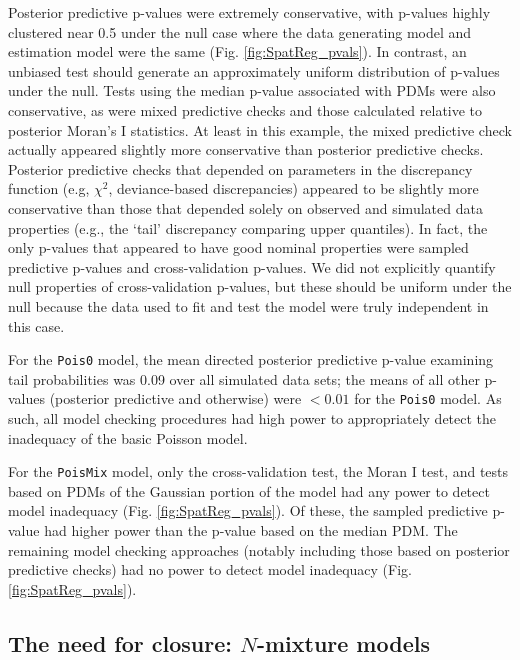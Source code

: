 \documentclass[12pt,english]{article}
\begin{document}
\begin{spacing}{1.9}
Posterior predictive p-values were extremely conservative, with
p-values highly clustered near 0.5 under the null case where the data
generating model and estimation model were the same
(Fig. \ref{fig:SpatReg_pvals}).  In contrast, an unbiased test should
generate an approximately uniform distribution of p-values under the
null.  Tests using the median p-value associated with PDMs were also
conservative, as were mixed predictive checks and those calculated
relative to posterior Moran's I statistics.  At least in this example,
the mixed predictive check actually appeared slightly more
conservative than posterior predictive checks.  Posterior predictive
checks that depended on parameters in the discrepancy function (e.g,
$\chi^2$, deviance-based discrepancies) appeared to be slightly more
conservative than those that depended solely on observed and simulated
data properties (e.g., the `tail' discrepancy comparing upper
quantiles).  In fact, the only p-values that appeared to have good
nominal properties were sampled predictive p-values and
cross-validation p-values.  We did not explicitly quantify null
properties of cross-validation p-values, but these should be uniform
under the null because the data used to fit and test the model were
truly independent in this case.

For the \texttt{Pois0} model, the mean directed posterior predictive
p-value examining tail probabilities was 0.09 over all simulated data
sets; the means of all other p-values (posterior predictive and
otherwise) were $<0.01$ for the \texttt{Pois0} model.  As such, all
model checking procedures had high power to appropriately detect the
inadequacy of the basic Poisson model.

For the \texttt{PoisMix} model, only the cross-validation test, the
Moran I test, and tests based on PDMs of the Gaussian portion of the
model had any power to detect model inadequacy
(Fig. \ref{fig:SpatReg_pvals}).  Of these, the sampled predictive
p-value had higher power than the p-value based on the median PDM.
The remaining model checking approaches (notably including those based
on posterior predictive checks) had no power to detect model
inadequacy (Fig. \ref{fig:SpatReg_pvals}).



\subsection{The need for closure: $N$-mixture models}


\end{spacing}
\end{document}
